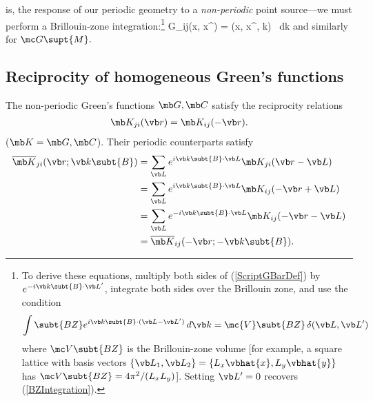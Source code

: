 \documentclass[letterpaper]{article}
\begin{document}
is, the response of our periodic geometry to a \textit{non-periodic}
point source---we must perform a Brillouin-zone 
integration:\footnote{To derive these equations, multiply both sides
of (\ref{ScriptGBarDef}) by $e^{-i\vb k\subt{B} \cdot \vb L^\prime}$,
integrate both sides over the Brillouin zone, and use the
condition 
$$\int\subt{BZ} e^{i\vb k\subt{B}\cdot (\vb L-\vb L^\prime)}\,d\vb k
  =\mc{V}\subt{BZ} \, \delta(\vb L,\vb L^\prime)
$$
where $\mc V\subt{BZ}$ is the Brillouin-zone volume [for example,
a square lattice with basis vectors
$\{\vb L_1, \vb L_2\}=\{L_x\vbhat{x}, L_y\vbhat{y}\}$ has
$\mc V\subt{BZ}=4\pi^2/(L_x L_y)$].
Setting $\vb L^\prime=0$ recovers (\ref{BZIntegration}).}
{
  \mc G_{ij}(\vb x, \vb x^\prime)
 = 
   \int{} 
   (\vb x, \vb x^\prime, \vb k)
   \, d\vb k
}
and similarly for $\mc G\supt{M}.$

\subsection*{Reciprocity of homogeneous Green's functions}

The non-periodic Green's functions $\mb G, \mb C$ 
satisfy the reciprocity relations
\begin{align*}
  \mb K_{ji}(\vb r) = \mb K_{ij}(-\vb r).
\end{align*}
($\mb K=\mb G,\mb C$). Their periodic counterparts satisfy
\begin{align*}
 \overline{\mb K}_{ji}(\vb r; \vb k\subt{B})
 &= \sum_{\vb L} e^{i\vb k\subt{B}\cdot \vb L}
    \mb K_{ji}(\vb r - \vb L)
\\
 &= \sum_{\vb L} e^{i\vb k\subt{B}\cdot \vb L}
    \mb K_{ij}(-\vb r + \vb L)
\\
 &= \sum_{\vb L} e^{-i\vb k\subt{B}\cdot \vb L}
    \mb K_{ij}(-\vb r - \vb L)
\\
 &= \overline{\mb K}_{ij}(-\vb r; -\vb k\subt{B}).
\end{align*}
\end{document}

